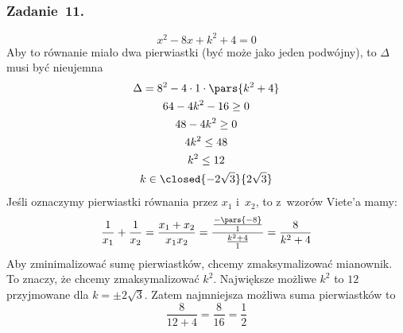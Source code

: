 \subsubsection*{Zadanie~11.}
\begin{equation*}
    x^2 - 8x + k^2 + 4 = 0
\end{equation*}
Aby to równanie miało dwa pierwiastki (być może jako jeden podwójny), to \(\Delta\) musi być nieujemna
\begin{gather*}
    \Delta = 8^2 - 4 \cdot 1 \cdot \pars{k^2 + 4}\\
    64 - 4k^2 - 16 \geq 0\\
    48 - 4k^2 \geq 0\\
    4k^2 \leq 48\\
    k^2 \leq 12\\
    k \in \closed{-2\sqrt{3}}{2\sqrt{3}}
\end{gather*}
Jeśli oznaczymy pierwiastki równania przez \(x_1\) i~\(x_2\), to z~wzorów Viete'a mamy:
\begin{equation*}
    \frac{1}{x_1} + \frac{1}{x_2}
        = \frac{x_1 + x_2}{x_1x_2}
        = \frac{\frac{-\pars{-8}}{1}}{\frac{k^2 + 4}{1}}
        = \frac{8}{k^2 + 4}
\end{equation*}
Aby zminimalizować sumę pierwiastków, chcemy zmaksymalizować mianownik. To znaczy, że chcemy zmaksymalizować \(k^2\). Największe możliwe \(k^2\) to \(12\) przyjmowane dla \(k = \pm2\sqrt{3}\). Zatem najmniejsza możliwa suma pierwiastków to
\begin{equation*}
    \frac{8}{12 + 4} = \frac{8}{16} = \frac{1}{2}
\end{equation*}
